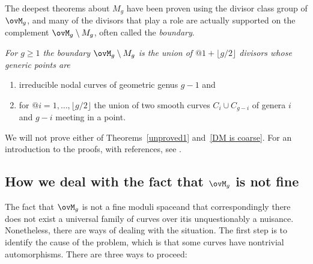 The deepest theorems about $M_{g}$ have been proven using the 
divisor class group
%
 of $\ovM_{g}$,
and many of the divisors that play a role are actually supported on
the complement $\ovM_{g} \setminus M_{g}$, often called the
\emph{boundary}.
{\meshing\par}

\begin{fact}
\it
For $g\geq 1$ the boundary $\ovM_{g}\setminus M_{g}$ is the
union of $@1+\lfloor{g/2}\rfloor$ divisors whose generic points are 
\begin{enumerate}
 \item irreducible nodal curves of geometric genus $g-1$
and
 \item for $@i = 1, \dots,\lfloor{g/2}\rfloor$
the union of two smooth curves $C_{i}\cup C_{g-i}$ of genera
 $i$ and $g-i$ meeting in a point.
\end{enumerate}
\baselineskip
\end{fact}

We will not prove either of Theorems~\ref{unproved1} 
and~\ref{DM is coarse}. For an introduction to the 
proofs, with references, see \cite{MR1631825}.

\subsection*{How we deal with the fact that $\ovM_g$ is not fine}

The fact that $\ovM_g$ is not a fine moduli space\emdash and that
correspondingly
there does not exist a universal family
%
of curves over
it\emdash is unquestionably a nuisance. Nonetheless, there are ways of
dealing with the situation. The first step is to identify the cause of
the problem, which is that some curves have nontrivial automorphisms.
There are three ways to proceed:
%

